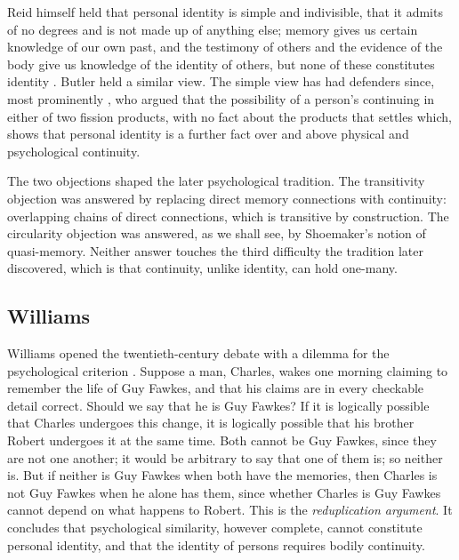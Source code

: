 \documentclass{situationist-preprint}
\begin{document}
Reid himself held that personal identity is simple and indivisible, that it admits of no degrees and is not made up of anything else; memory gives us certain knowledge of our own past, and the testimony of others and the evidence of the body give us knowledge of the identity of others, but none of these constitutes identity \citep[III.4]{Reid1785}. Butler held a similar view. The simple view has had defenders since, most prominently \citet{Swinburne1984}, who argued that the possibility of a person's continuing in either of two fission products, with no fact about the products that settles which, shows that personal identity is a further fact over and above physical and psychological continuity.

The two objections shaped the later psychological tradition. The transitivity objection was answered by replacing direct memory connections with continuity: overlapping chains of direct connections, which is transitive by construction. The circularity objection was answered, as we shall see, by Shoemaker's notion of quasi-memory. Neither answer touches the third difficulty the tradition later discovered, which is that continuity, unlike identity, can hold one-many.

\subsection{Williams}

Williams opened the twentieth-century debate with a dilemma for the psychological criterion \citep{Williams1957}. Suppose a man, Charles, wakes one morning claiming to remember the life of Guy Fawkes, and that his claims are in every checkable detail correct. Should we say that he is Guy Fawkes? If it is logically possible that Charles undergoes this change, it is logically possible that his brother Robert undergoes it at the same time. Both cannot be Guy Fawkes, since they are not one another; it would be arbitrary to say that one of them is; so neither is. But if neither is Guy Fawkes when both have the memories, then Charles is not Guy Fawkes when he alone has them, since whether Charles is Guy Fawkes cannot depend on what happens to Robert. This is the \emph{reduplication argument}. It concludes that psychological similarity, however complete, cannot constitute personal identity, and that the identity of persons requires bodily continuity.
\end{document}
